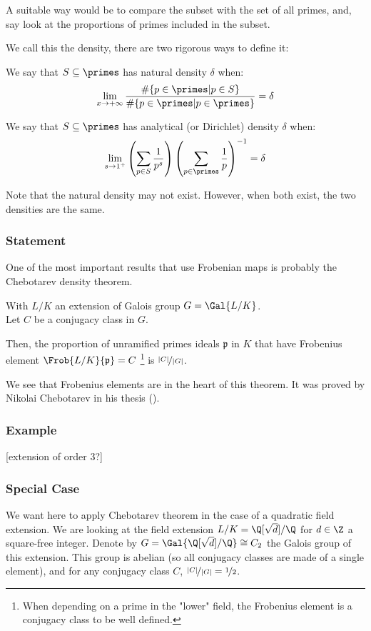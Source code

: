 A suitable way would be to compare the subset with the set of all primes, and, say look at the proportions of primes included in the subset.

We call this the density, there are two rigorous ways to define it:
\begin{definition}
	We say that $S \subseteq \primes$ has natural density $\delta$ when:
	$$
	\lim_{x \to +\infty}
	\frac{ \# \{ p \in \primes | p \in S \}}
	{ \# \{ p \in \primes | p \in \primes \}} = \delta
	$$
\end{definition}
\begin{definition}
	We say that $S \subseteq \primes$ has analytical (or Dirichlet) density $\delta$ when:
	$$
	\lim_{s \to 1^+}
	\left( \sum_{p \in S} \frac{1}{p^s} \right) 
	\left( \sum_{p \in \primes} \frac{1}{p} \right)^{-1} = \delta
	$$
\end{definition}

Note that the natural density may not exist.
However, when both exist, the two densities are the same.



\subsubsection{Statement}
One of the most important results that use Frobenian maps is probably the Chebotarev density theorem.
\begin{theorem}
	With $L/K$ an extension of Galois group $G=\Gal{L/K}$.\\
	Let $C$ be a conjugacy class in $G$.
	
	Then, the proportion of unramified primes ideals $\mathfrak{p}$ in $K$ that have Frobenius element $\Frob{L/K}{\mathfrak{p}}=C$ \footnote{When depending on a prime in the "lower" field, the Frobenius element is a conjugacy class to be well defined.} is $\nicefrac{|C|}{|G|}$.
\end{theorem}
We see that Frobenius elements are in the heart of this theorem.
It was proved by Nikolai Chebotarev in his thesis (\cite{ChebotarevTheorem}).

\subsubsection{Example}
[extension of order 3?]

\subsubsection{Special Case}
We want here to apply Chebotarev theorem in the case of a quadratic field extension.
We are looking at the field extension $L/K = \Q[\sqrt{d}]/\Q$ for $d \in \Z$ a square-free integer.
Denote by $G = \Gal{\Q[\sqrt{d}]/\Q} \cong C_2$ the Galois group of this extension.
This group is abelian (so all conjugacy classes are made of a single element), and for any conjugacy class $C$, $\nicefrac{|C|}{|G|} = \nicefrac{1}{2}$.

